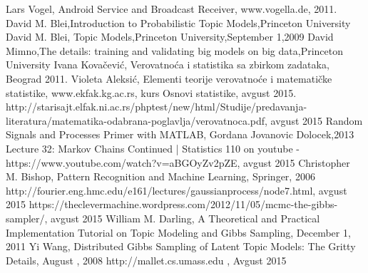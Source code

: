 %
%
\begin{thebibliography}{11}
 {Lars Vogel, Android Service and Broadcast Receiver, www.vogella.de, 2011.}
 { David M. Blei,Introduction to Probabilistic Topic Models,Princeton University}
 { David M. Blei, Topic Models,Princeton University,September 1,2009}
 { David Mimno,The details: training	and validating big	models on big data,Princeton University}
 {Ivana Kovačević, Verovatnoća i statistika sa zbirkom zadataka, Beograd 2011.}
 {Violeta Aleksić, Elementi teorije verovatnoće i matematičke statistike, }
 {www.ekfak.kg.ac.rs, kurs Osnovi statistike, avgust 2015.}
 {http://starisajt.elfak.ni.ac.rs/phptest/new/html/Studije/predavanja-literatura/matematika-odabrana-poglavlja/verovatnoca.pdf, avgust 2015}
 {Random Signals and Processes Primer with MATLAB, Gordana Jovanovic Dolocek,2013}
 {Lecture 32: Markov Chains Continued | Statistics 110  on youtube - https://www.youtube.com/watch?v=aBGOyZv2pZE, avgust 2015}
 {Christopher M. Bishop, Pattern Recognition and
Machine Learning, Springer, 2006}
 {http://fourier.eng.hmc.edu/e161/lectures/gaussianprocess/node7.html, avgust 2015}
 {https://theclevermachine.wordpress.com/2012/11/05/mcmc-the-gibbs-sampler/, avgust 2015}
 {William M. Darling, A Theoretical and Practical Implementation Tutorial on Topic Modeling and Gibbs Sampling, December 1, 2011}
 {Yi Wang, Distributed Gibbs Sampling of Latent Topic Models: The Gritty Details, August , 2008}
 {http://mallet.cs.umass.edu , Avgust 2015}
\end{thebibliography}

